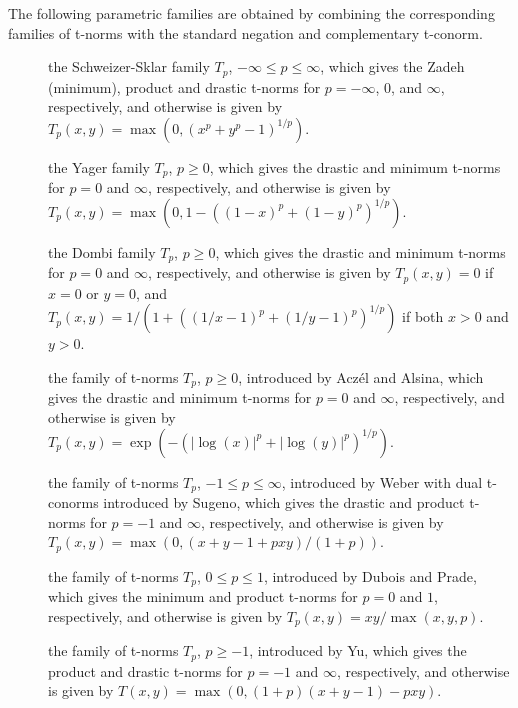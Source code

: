 \documentclass[article]{jss}
\newcommand{\eqn}[1]{$#1$}
\begin{document}
\begin{appendix}
  \noindent The following parametric families are obtained by combining the
  corresponding families of t-norms with the standard negation and
  complementary t-conorm.

  \begin{description}
  \item[]{the Schweizer-Sklar family
      \eqn{T_p}, \eqn{-\infty \le p \le \infty}, which
      gives the Zadeh (minimum), product and drastic t-norms for
      \eqn{p = -\infty}, \eqn{0}, and \eqn{\infty},
      respectively, and otherwise is given by
      \eqn{T_p(x, y) = \max(0, (x^p + y^p - 1)^{1/p})}.}
  \item[]{the Yager family \eqn{T_p}, \eqn{p \ge 0},
      which gives the drastic and minimum t-norms for \eqn{p = 0}
      and \eqn{\infty}, respectively, and otherwise is given by
      \eqn{T_p(x, y) = \max(0, 1 - ((1-x)^p + (1-y)^p)^{1/p})}.}
  \item[]{the Dombi family \eqn{T_p}, \eqn{p \ge 0},
      which gives the drastic and minimum t-norms for \eqn{p = 0}
      and \eqn{\infty}, respectively, and otherwise is given by
      \eqn{T_p(x, y) = 0} if \eqn{x = 0} or \eqn{y = 0}, and
      \eqn{T_p(x, y) = 1 / (1 + ((1/x - 1)^p + (1/y - 1)^p)^{1/p})} if
      both \eqn{x > 0} and \eqn{y > 0}.}
  \item[]{the family of t-norms \eqn{T_p},
      \eqn{p \ge 0}, introduced by Acz{\'e}l and Alsina, which gives the
      drastic and minimum t-norms for \eqn{p = 0} and
      \eqn{\infty}, respectively, and otherwise is given by
      \eqn{T_p(x, y) = \exp(-(|\log(x)|^p + |\log(y)|^p)^{1/p})}.}
  \item[]{the family of t-norms \eqn{T_p},
      \eqn{-1 \le p \le \infty}, introduced by Weber
      with dual t-conorms introduced by Sugeno, which gives the
      drastic and product t-norms for \eqn{p = -1} and
      \eqn{\infty}, respectively, and otherwise is given by
      \eqn{T_p(x, y) = \max(0, (x + y - 1 + pxy) / (1 + p))}.}
  \item[]{the family of t-norms \eqn{T_p},
      \eqn{0 \le p \le 1}, introduced by Dubois and Prade, which gives
      the minimum and product t-norms for \eqn{p = 0} and \eqn{1},
      respectively, and otherwise is given by
      \eqn{T_p(x, y) = xy / \max(x, y, p)}.}
  \item[]{the family of t-norms \eqn{T_p}, \eqn{p \ge -1},
      introduced by Yu, which gives the product and drastic t-norms for
      \eqn{p = -1} and \eqn{\infty}, respectively, and otherwise is
      given by \eqn{T(x, y) = \max(0, (1 + p) (x + y - 1) - p x y)}.}
  \end{description}

\end{appendix}


\end{document}
